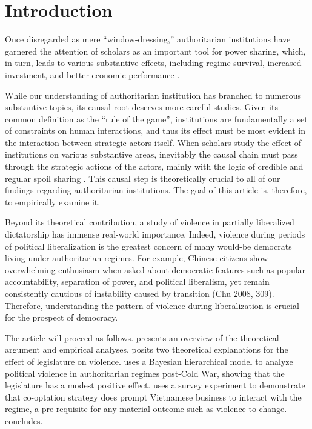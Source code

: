 \section{Introduction}
\label{sec:introduction}

Once disregarded as mere ``window-dressing,'' authoritarian institutions have garnered the attention of scholars as an important tool for power sharing, which, in turn, leads to various substantive effects, including regime survival, increased investment, and better economic performance \citep{Gandhi2008, Wright2008, Boix2013}.

While our understanding of authoritarian institution has branched to numerous substantive topics, its causal root deserves more careful studies. Given its common definition as the ``rule of the game'', institutions are fundamentally a set of constraints on human interactions, and thus its effect must be most evident in the interaction between strategic actors itself.  When scholars study the effect of institutions on various substantive areas, inevitably the causal chain must pass through the strategic actions of the actors, mainly with the logic of credible and regular spoil sharing \citep{Gandhi2007, Svolik2012}. This causal step is theoretically crucial to all of our findings regarding authoritarian institutions. The goal of this article is, therefore, to empirically examine it.

Beyond its theoretical contribution, a study of violence in partially liberalized dictatorship has immense real-world importance. Indeed, violence during periods of political liberalization is the greatest concern of many would-be democrats living under authoritarian regimes. For example, Chinese citizens show overwhelming enthusiasm when asked about democratic features such as popular accountability, separation of power, and political liberalism, yet remain consistently cautious of instability caused by transition (Chu 2008, 309). Therefore, understanding the pattern of violence during liberalization is crucial for the prospect of democracy.

The article will proceed as follows.  presents an overview of the theoretical argument and empirical analyses.  posits two theoretical explanations for the effect of legislature on violence.  uses a Bayesian hierarchical model to analyze political violence in authoritarian regimes post-Cold War, showing that the legislature has a modest positive effect.  uses a survey experiment to demonstrate that co-optation strategy does prompt Vietnamese business to interact with the regime, a pre-requisite for any material outcome such as violence to change.  concludes.